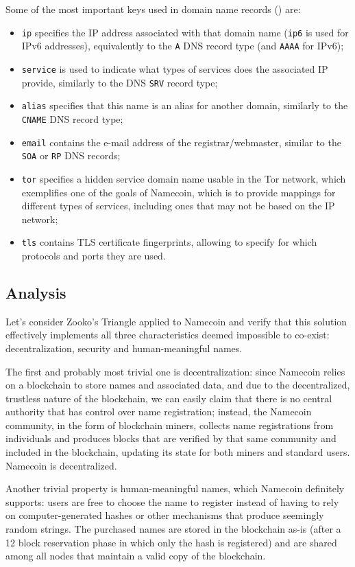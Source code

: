 \documentclass[mscthesis]{usiinfthesis}
\begin{document}
Some of the most important keys used in domain name records (\cite{website:namecoindomainwiki}) are:
\begin{itemize}
	\item \texttt{ip} specifies the IP address associated with that domain name (\texttt{ip6} is used for IPv6 addresses), equivalently to the \texttt{A} DNS record type (and \texttt{AAAA} for IPv6);
	\item \texttt{service} is used to indicate what types of services does the associated IP provide, similarly to the DNS \texttt{SRV} record type;
	\item \texttt{alias} specifies that this name is an alias for another domain, similarly to the \texttt{CNAME} DNS record type;
	\item \texttt{email} contains the e-mail address of the registrar/webmaster, similar to the \texttt{SOA} or \texttt{RP} DNS records;
	\item \texttt{tor} specifies a hidden service domain name usable in the Tor network, which exemplifies one of the goals of Namecoin, which is to provide mappings for different types of services, including ones that may not be based on the IP network;
	\item \texttt{tls} contains TLS certificate fingerprints, allowing to specify for which protocols and ports they are used.
\end{itemize}

\subsection{Analysis}
Let's consider Zooko's Triangle applied to Namecoin and verify that this solution effectively implements all three characteristics deemed impossible to co-exist: decentralization, security and human-meaningful names.

The first and probably most trivial one is decentralization: since Namecoin relies on a blockchain to store names and associated data, and due to the decentralized, trustless nature of the blockchain, we can easily claim that there is no central authority that has control over name registration; instead, the Namecoin community, in the form of blockchain miners, collects name registrations from individuals and produces blocks that are verified by that same community and included in the blockchain, updating its state for both miners and standard users. Namecoin is decentralized.

Another trivial property is human-meaningful names, which Namecoin definitely supports: users are free to choose the name to register instead of having to rely on computer-generated hashes or other mechanisms that produce seemingly random strings. The purchased names are stored in the blockchain as-is (after a 12 block reservation phase in which only the hash is registered) and are shared among all nodes that maintain a valid copy of the blockchain.
\end{document}
